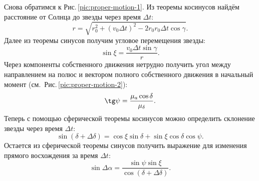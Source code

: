 Снова обратимся к Рис.\,\ref{pic:proper-motion-1}. Из теоремы косинусов найдём расстояние от Солнца до звезды через время $\Delta t$:
\begin{equation*}
	r = \sqrt{r_0^2 + (v_0 \Delta t)^2 - 2 r_0 r_0 \Delta t \cos \gamma}.
\end{equation*}
Далее из теоремы синусов получим угловое перемещения звезды:
\begin{equation*}
	\sin \xi = \frac{v_0 \Delta t \sin \gamma}{r}.
\end{equation*}
Через компоненты собственного движения нетрудно получить угол между направлением на полюс и вектором полного собственного движения в начальный момент (см.~Рис.\,\ref{pic:proper-motion-2}):
\begin{equation*}
	\tg \psi =  \frac{\mu_a \cos \delta}{\mu_\delta}.
\end{equation*}
Теперь с помощью сферической теоремы косинусов можно определить склонение звезды через время $\Delta t$:
\begin{equation*}
	\sin (\delta + \Delta \delta) = \cos \xi \sin \delta + \sin \xi \cos \delta \cos \psi.
\end{equation*}
Остается из сферической теоремы синусов получить выражение для изменения прямого восхождения за время $\Delta t$:
\begin{equation*}
	\sin \Delta \alpha = \frac{\sin \psi \sin \xi}{\cos (\delta + \Delta \delta)}.
\end{equation*}


